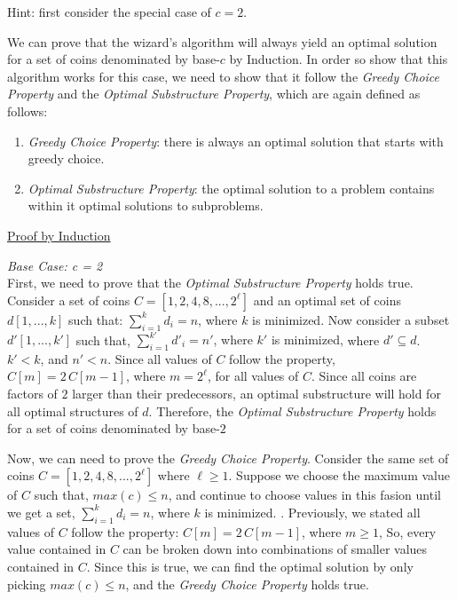 \documentclass[12pt]{article}
\begin{document}
\begin{enumerate}
\begin{enumerate}
	Hint: first consider the special case of $c=2$.

	{\color{blue}
		We can prove that the wizard's algorithm will always yield an optimal solution for a set of coins denominated by base-$c$ by Induction. In order so show that this algorithm works for this case, we need to show that it follow the \emph{Greedy Choice Property} and the \emph{Optimal Substructure Property}, which are again defined as follows:
		\begin{enumerate}
			\item \emph{Greedy Choice Property}: there is always an optimal solution that starts with greedy choice.
			\item \emph{Optimal Substructure Property}: the optimal solution to a problem contains within it optimal solutions to subproblems.
		\end{enumerate}\newpage

		\underline{Proof by Induction}

		\emph{Base Case: c = 2}\\
		First, we need to prove that the \emph{Optimal Substructure Property} holds true. Consider a set of coins $C = [1, 2, 4, 8, ... , 2^\ell]$ and an optimal set of coins $d[1,...,k]$ such that:
		{\center $\sum_{i = 1}^{k} d_{i} = n$, where $k$ is minimized. \endcenter}
		Now consider a subset  $d'[1,...,k']$ such that,
		{\center $\sum_{i = 1}^{k'} d'_{i} = n'$, where $k'$ is minimized, \endcenter}
		where $ d' \subseteq d$. $k' < k$, and $n' < n$. Since all values of $C$ follow the property,
		{\center $C[m] = 2\,C[m-1]$, where $m = 2^\ell$, \endcenter}
		for all values of $C$. Since all coins are factors of $2$ larger than their predecessors, an optimal substructure will hold for all optimal structures of $d$. Therefore, the \emph{Optimal Substructure Property} holds for a set of coins denominated by base-$2$

		Now, we can need to prove the \emph{Greedy Choice Property}. Consider the same set of coins $C = [1, 2, 4, 8, ... , 2^\ell]$ where $\ell \geq 1$. Suppose we choose the maximum value of $C$ such that, 
		{\center $max(c) \leq n$,\endcenter}
		and continue to choose values in this fasion until we get a set,
		{\center $\sum_{i = 1}^{k} d_{i} = n$, where $k$ is minimized. \endcenter}.
		Previously, we stated all values of $C$ follow the property:
		{\center $C[m] = 2\,C[m - 1]$, where $m \geq 1$, \endcenter}
		So, every value contained in $C$ can be broken down into combinations of smaller values contained in $C$. Since this is true, we can find the optimal solution by only picking $max(c) \leq n$, and the \emph{Greedy Choice Property} holds true.

}
\end{enumerate}
\end{enumerate}
\end{document}
